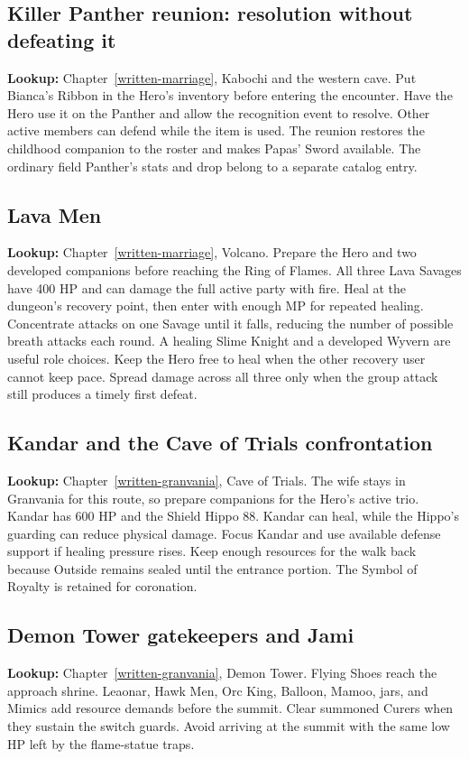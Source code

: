 \subsection{Killer Panther reunion: resolution without defeating it}
\textbf{Lookup:} Chapter~\ref{written-marriage}, Kabochi and the western cave. Put Bianca's Ribbon in the Hero's inventory before entering the encounter. Have the Hero use it on the Panther and allow the recognition event to resolve. Other active members can defend while the item is used. The reunion restores the childhood companion to the roster and makes Papas' Sword available. The ordinary field Panther's stats and drop belong to a separate catalog entry.

\subsection{Lava Men}
\textbf{Lookup:} Chapter~\ref{written-marriage}, Volcano. Prepare the Hero and two developed companions before reaching the Ring of Flames. All three Lava Savages have 400 HP and can damage the full active party with fire. Heal at the dungeon's recovery point, then enter with enough MP for repeated healing. Concentrate attacks on one Savage until it falls, reducing the number of possible breath attacks each round. A healing Slime Knight and a developed Wyvern are useful role choices. Keep the Hero free to heal when the other recovery user cannot keep pace. Spread damage across all three only when the group attack still produces a timely first defeat.

\subsection{Kandar and the Cave of Trials confrontation}
\textbf{Lookup:} Chapter~\ref{written-granvania}, Cave of Trials. The wife stays in Granvania for this route, so prepare companions for the Hero's active trio. Kandar has 600 HP and the Shield Hippo 88. Kandar can heal, while the Hippo's guarding can reduce physical damage. Focus Kandar and use available defense support if healing pressure rises. Keep enough resources for the walk back because Outside remains sealed until the entrance portion. The Symbol of Royalty is retained for coronation.

\subsection{Demon Tower gatekeepers and Jami}
\textbf{Lookup:} Chapter~\ref{written-granvania}, Demon Tower. Flying Shoes reach the approach shrine. Leaonar, Hawk Men, Orc King, Balloon, Mamoo, jars, and Mimics add resource demands before the summit. Clear summoned Curers when they sustain the switch guards. Avoid arriving at the summit with the same low HP left by the flame-statue traps.

